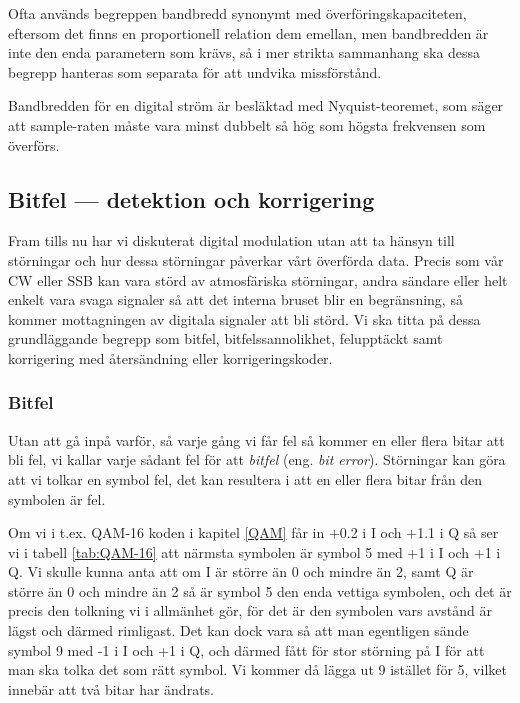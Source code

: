 Ofta används begreppen bandbredd synonymt med överföringskapaciteten, eftersom
det finns en proportionell relation dem emellan, men bandbredden är inte den
enda parametern som krävs, så i mer strikta sammanhang ska dessa begrepp
hanteras som separata för att undvika missförstånd.

Bandbredden för en digital ström är besläktad med Nyquist-teoremet, som säger
att sample-raten måste vara minst dubbelt så hög som högsta frekvensen som
överförs.

\subsection{Bitfel --- detektion och korrigering}

Fram tills nu har vi diskuterat digital modulation utan att ta hänsyn till
störningar och hur dessa störningar påverkar vårt överförda data. Precis som
vår CW eller SSB kan vara störd av atmosfäriska störningar, andra sändare
eller helt enkelt vara svaga signaler så att det interna bruset blir en
begränsning, så kommer mottagningen av digitala signaler att bli störd.
Vi ska titta på dessa grundläggande begrepp som bitfel, bitfelssannolikhet,
felupptäckt samt korrigering med återsändning eller korrigeringskoder.

\subsubsection{Bitfel}

Utan att gå inpå varför, så varje gång vi får fel så kommer en eller flera
bitar att bli fel, vi kallar varje sådant fel för att \emph{bitfel} (eng.
\emph{bit error}). Störningar kan göra att vi tolkar en symbol fel, det kan
resultera i att en eller flera bitar från den symbolen är fel.

Om vi i t.ex. QAM-16 koden i kapitel \ref{QAM} får in +0.2 i I och +1.1 i Q
så ser vi i tabell \ref{tab:QAM-16} att närmsta symbolen är symbol 5 med +1 i I
och +1 i Q. Vi skulle kunna anta att om I är större än 0 och mindre än 2, samt
Q är större än 0 och mindre än 2 så är symbol 5 den enda vettiga symbolen, och
det är precis den tolkning vi i allmänhet gör, för det är den symbolen vars
avstånd är lägst och därmed rimligast. Det kan dock vara så att man egentligen
sände symbol 9 med -1 i I och +1 i Q, och därmed fått för stor störning på I
för att man ska tolka det som rätt symbol. Vi kommer då lägga ut 9 istället
för 5, vilket innebär att två bitar har ändrats.

